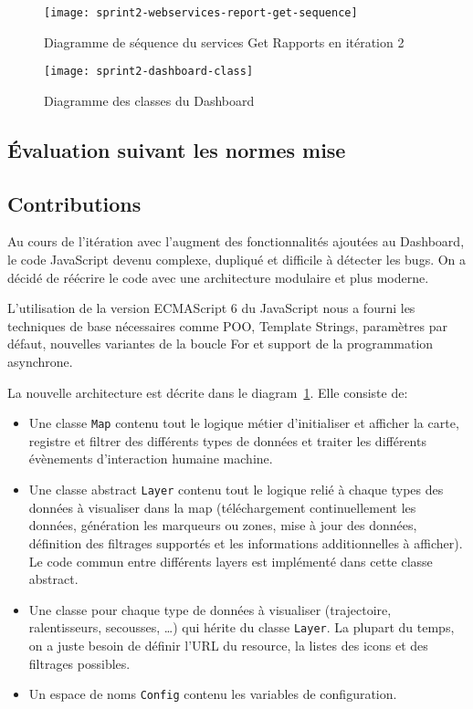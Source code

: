 \begin{figure}[htbp]
    \centering
    \texttt{[image: sprint2-webservices-report-get-sequence]}
    \caption{Diagramme de séquence du services Get Rapports en itération 2}
\end{figure}

\begin{figure}[htbp]
    \centering
    \texttt{[image: sprint2-dashboard-class]}
    \caption{Diagramme des classes du Dashboard}
    \label{fig:sprint2-dashboard-class}
\end{figure}

\subsection{Évaluation suivant les normes mise}


\subsection{Contributions}

Au cours de l'itération avec l'augment des fonctionnalités ajoutées au
Dashboard, le code JavaScript devenu complexe, dupliqué et difficile à détecter
les bugs. On a décidé de réécrire le code avec une architecture modulaire et
plus moderne.

L'utilisation de la version ECMAScript 6 du JavaScript nous a fourni les
techniques de base nécessaires comme POO, Template Strings, paramètres par
défaut, nouvelles variantes de la boucle For et support de la programmation
asynchrone.

La nouvelle architecture est décrite dans le
diagram~\ref{fig:sprint2-dashboard-class}. Elle consiste de:

\begin{itemize}
    \item Une classe \verb|Map| contenu tout le logique métier d'initialiser et
        afficher la carte, registre et filtrer des différents types de données
        et traiter les différents évènements d'interaction humaine machine.
    \item Une classe abstract \verb|Layer| contenu tout le logique relié à
        chaque types des données à visualiser dans la map (téléchargement
        continuellement les données, génération les marqueurs ou zones, mise à
        jour des données, définition des filtrages supportés et les
        informations additionnelles à afficher). Le code commun entre
        différents layers est implémenté dans cette classe abstract.
    \item Une classe pour chaque type de données à visualiser (trajectoire,
        ralentisseurs, secousses, \ldots) qui hérite du classe \verb|Layer|. La
        plupart du temps, on a juste besoin de définir l'URL du resource, la
        listes des icons et des filtrages possibles.
    \item Un espace de noms \verb|Config| contenu les variables de
        configuration.
\end{itemize}

